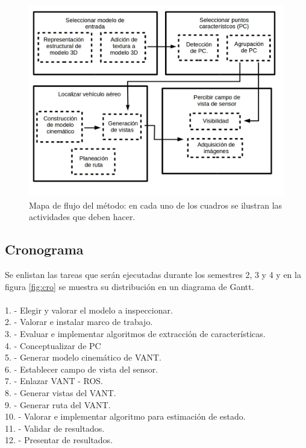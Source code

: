 \documentclass[]{report}
\begin{document}
\begin{figure}[h]
\centering
\includegraphics[scale = 0.5]{mapa.jpg}
\caption{Mapa de flujo del método: en cada uno de los cuadros se ilustran las actividades que deben hacer.}
\label{fig:met}
\end{figure}



\subsection{Cronograma}

Se enlistan las tareas que serán ejecutadas durante los semestres 2, 3 y 4 y en la figura \ref {fig:cro}  se muestra su distribución en un diagrama de Gantt.\\\\
1. - Elegir y valorar el modelo a inspeccionar.\\
2. - Valorar e instalar marco de trabajo.\\
3. - Evaluar e implementar algoritmos de extracción de características.\\
4. - Conceptualizar de PC\\
5. - Generar modelo cinemático de VANT.\\
6. - Establecer campo de vista del sensor.\\
7. - Enlazar VANT - ROS.\\
8. - Generar vistas del VANT.\\
9. - Generar ruta del VANT.\\
10. - Valorar e implementar algoritmo para estimación de estado.\\
11. - Validar de resultados.\\
12. - Presentar de resultados.\\
\end{document}
